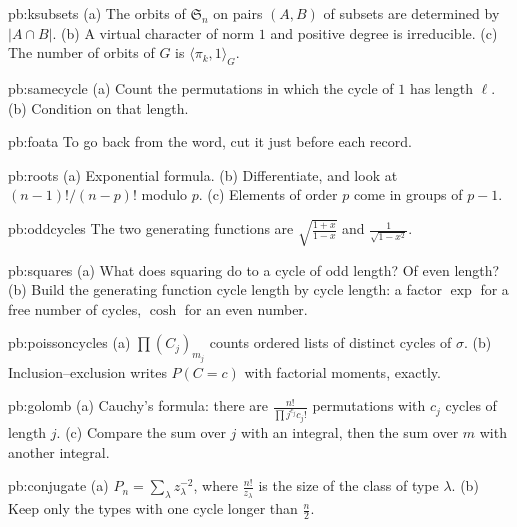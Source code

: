 \begin{hint}{pb:ksubsets}
(a) The orbits of $\mathfrak S_n$ on pairs $(A,B)$ of subsets are determined by $|A\cap B|$. (b) A virtual character of norm
$1$ and positive degree is irreducible. (c) The number of orbits of $G$ is $\langle\pi_k,1\rangle_G$.
\end{hint}

\begin{hint}{pb:samecycle}
(a) Count the permutations in which the cycle of $1$ has length $\ell$. (b) Condition on that length.
\end{hint}

\begin{hint}{pb:foata}
To go back from the word, cut it just before each record.
\end{hint}

\begin{hint}{pb:roots}
(a) Exponential formula. (b) Differentiate, and look at $(n-1)!/(n-p)!$ modulo $p$. (c) Elements of order $p$ come in groups
of $p-1$.
\end{hint}

\begin{hint}{pb:oddcycles}
The two generating functions are $\sqrt{\frac{1+x}{1-x}}$ and $\frac1{\sqrt{1-x^2}}$.
\end{hint}

\begin{hint}{pb:squares}
(a) What does squaring do to a cycle of odd length? Of even length? (b) Build the generating function cycle length by cycle
length: a factor $\exp$ for a free number of cycles, $\cosh$ for an even number.
\end{hint}

\begin{hint}{pb:poissoncycles}
(a) $\prod(C_j)_{m_j}$ counts ordered lists of distinct cycles of $\sigma$. (b) Inclusion--exclusion writes $P(C=c)$ with
factorial moments, exactly.
\end{hint}

\begin{hint}{pb:golomb}
(a) Cauchy's formula: there are $\frac{n!}{\prod j^{c_j}c_j!}$ permutations with $c_j$ cycles of length $j$. (c) Compare the sum
over $j$ with an integral, then the sum over $m$ with another integral.
\end{hint}

\begin{hint}{pb:conjugate}
(a) $P_n=\sum_\lambda z_\lambda^{-2}$, where $\frac{n!}{z_\lambda}$ is the size of the class of type $\lambda$. (b) Keep only the
types with one cycle longer than $\frac n2$.
\end{hint}

